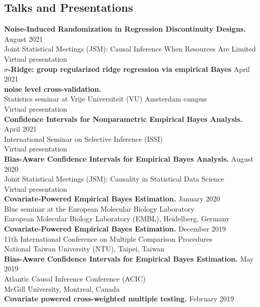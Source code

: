 \documentclass[margin,line]{res}
\begin{document}
\begin{resume}
\section{\sc Talks and Presentations}


\textbf{Noise-Induced Randomization in Regression Discontinuity Designs.} \hfill August 2021\\
Joint Statistical Meetings (JSM): Causal Inference When Resources Are Limited\\
Virtual presentation\\
\textbf{$\sigma$-Ridge: group regularized ridge regression via empirical Bayes} \hfill April 2021\\
 \textbf{noise level cross-validation.}\\
Statistics seminar at Vrije Universiteit (VU) Amsterdam campus\\
Virtual presentation\\
\textbf{Confidence Intervals for Nonparametric Empirical Bayes Analysis.} \hfill April 2021\\
International Seminar on Selective Inference (ISSI)\\
Virtual presentation\\
\textbf{Bias-Aware Confidence Intervals for Empirical Bayes Analysis.} \hfill August 2020\\
Joint Statistical Meetings (JSM): Causality in Statistical Data Science\\
Virtual presentation\\
\textbf{Covariate-Powered Empirical Bayes Estimation.} \hfill January 2020\\
Blue seminar at the European Molecular Biology Laboratory\\
European Molecular Biology Laboratory (EMBL), Heidelberg, Germany\\
\textbf{Covariate-Powered Empirical Bayes Estimation.} \hfill December 2019\\
11th International Conference on Multiple Comparison Procedures\\
National Taiwan University (NTU), Taipei, Taiwan\\
\textbf{Bias-Aware Confidence Intervals for Empirical Bayes Estimation.} \hfill May 2019\\
Atlantic Causal Inference Conference (ACIC)\\
McGill University, Montreal, Canada\\
\textbf{Covariate powered cross-weighted multiple testing.} \hfill February 2019\\

\end{resume}
\end{document}

